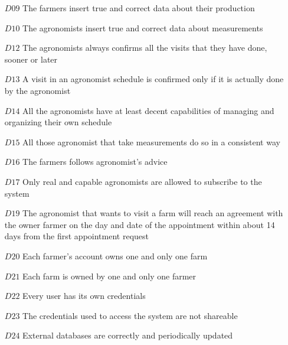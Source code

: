 \documentclass[10pt]{report}
\begin{document}
\begin{itemize}
    \item [$D09$] The farmers insert true and correct data about their production
    \item [$D10$] The agronomists insert true and correct data about measurements
    \item [$D12$] The agronomists always confirms all the visits that they have done, sooner or later
    \item [$D13$] A visit in an agronomist schedule is confirmed only if it is actually done by the agronomist
    \item [$D14$] All the agronomists have at least decent capabilities of managing and organizing their own schedule
    \item [$D15$] All those agronomist that take measurements do so in a consistent way
    \item [$D16$] The farmers follows agronomist’s advice
    \item [$D17$] Only real and capable agronomists are allowed to subscribe to the system
    \item [$D19$] The agronomist that wants to visit a farm will reach an agreement with the owner farmer on the day and date of the appointment within about 14 days from the first appointment request
    \item [$D20$] Each farmer’s account owns one and only one farm
    \item [$D21$] Each farm is owned by one and only one farmer
    \item [$D22$] Every user has its own credentials
    \item [$D23$] The credentials used to access the system are not shareable
    \item [$D24$] External databases are correctly and periodically updated
\end{itemize}
\end{document}
